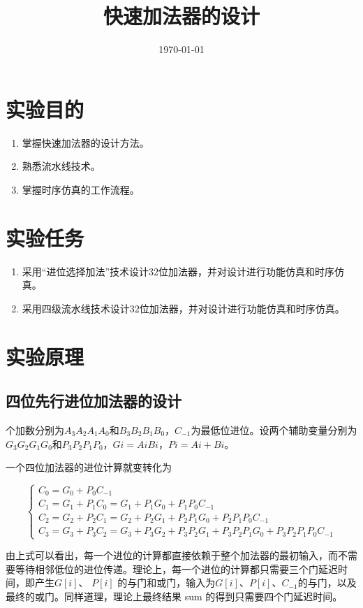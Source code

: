 \documentclass{../source/Experiment}
\title{快速加法器的设计}
\date{\today}
\begin{document}
\makecover
\makeheader


\section{实验目的}
\begin{enumerate}
    \item 掌握快速加法器的设计方法。
    \item 熟悉流水线技术。
    \item 掌握时序仿真的工作流程。
\end{enumerate}
\section{实验任务}
\begin{enumerate}
    \item 采用“进位选择加法”技术设计32位加法器，并对设计进行功能仿真和时序仿真。
    \item 采用四级流水线技术设计32位加法器，并对设计进行功能仿真和时序仿真。
\end{enumerate}
\section{实验原理}
\subsection{四位先行进位加法器的设计}
个加数分别为$A_3 A_2 A_1 A_0$和$B_3 B_2B_1B_0$，$C_{-1}$为最低位进位。设两个辅助变量分别为$G_3G_2G_1G_0$和$P_3P_2P_1P_0$，$Gi= Ai  Bi$，$Pi=Ai+Bi$。

一个四位加法器的进位计算就变转化为

$$
    \left\{\begin{array}{l}
        C_{0}=G_{0}+P_{0} C_{-1}                                                             \\
        C_{1}=G_{1}+P_{1} C_{0}=G_{1}+P_{1} G_{0}+P_{1} P_{0} C_{-1}                         \\
        C_{2}=G_{2}+P_{2} C_{1}=G_{2}+P_{2} G_{1}+P_{2} P_{1} G_{0}+P_{2} P_{1} P_{0} C_{-1} \\
        C_{3}=G_{3}+P_{3} C_{2}=G_{3}+P_{3} G_{2}+P_{3} P_{2} G_{1}+P_{3} P_{2} P_{1} G_{0}+P_{3} P_{2} P_{1} P_{0} C_{-1}
    \end{array}\right.
$$

由上式可以看出，每一个进位的计算都直接依赖于整个加法器的最初输入，而不需要等待相邻低位的进位传递。理论上，每一个进位的计算都只需要三个门延迟时间，即产生$G [i]$、 $P[ i]$ 的与门和或门，输入为$G [i]$、$P [i]$、$C_{-1}$的与门，以及最终的或门。同样道理，理论上最终结果 sum 的得到只需要四个门延迟时间。
\end{document}
